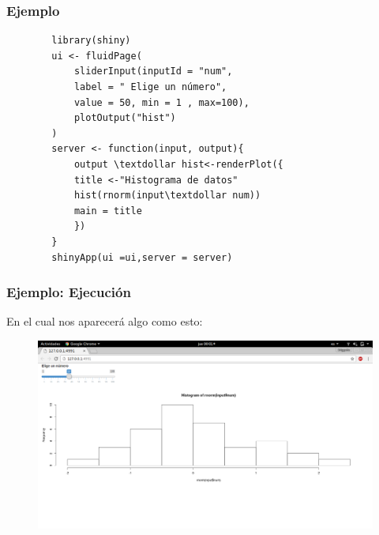 \documentclass{beamer}
\begin{document}
\begin{frame}[fragile]
	
	\frametitle{Ejemplo}
	\begin{verbatim}
		library(shiny)
		ui <- fluidPage(
		    sliderInput(inputId = "num",
		    label = " Elige un número",
		    value = 50, min = 1 , max=100),
		    plotOutput("hist")
		)
		server <- function(input, output){
		    output \textdollar hist<-renderPlot({
		    title <-"Histograma de datos"
		    hist(rnorm(input\textdollar num))
		    main = title	
		    })
		}
		shinyApp(ui =ui,server = server)
	\end{verbatim}
	
	
\end{frame}
\begin{frame}
	\frametitle{Ejemplo: Ejecución }
	En el cual nos aparecerá algo como esto:
	
		\begin{figure}[h!]
			\includegraphics[scale=0.2]{example1}
		\end{figure}
\end{frame}
\end{document}
